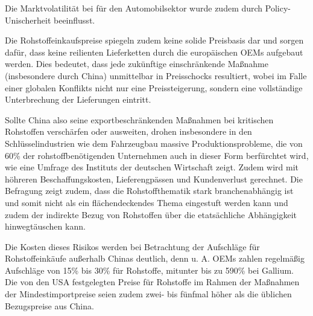 \documentclass[12pt,a4paper,oneside]{book} %
\begin{document}
{Die Marktvolatilität bei für den Automobilsektor wurde zudem durch Policy-Unischerheit\autocite{Mitchell, P. (2021). Why mineral supply may be an e-mobility roadblock. https://www.ey.com/en_gl/insights/energy-resources/why-mineralsupply-may-be-an-e-mobility-roadblock} beeinflusst.

Die Rohstoffeinkaufspreise spiegeln zudem keine solide Preisbasis dar und sorgen dafür, dass keine reilienten Lieferketten durch die europäischen OEMs aufgebaut werden. Dies bedeutet, dass jede zukünftige einschränkende Maßnahme (insbesondere durch China) unmittelbar in Preisschocks resultiert, wobei im Falle einer globalen Konflikts nicht nur eine Preissteigerung, sondern eine vollständige Unterbrechung der Lieferungen eintritt. 

Sollte China also seine exportbeschränkenden Maßnahmen bei kritischen Rohstoffen verschärfen oder ausweiten, drohen insbesondere in den Schlüsselindustrien wie dem Fahrzeugbau massive Produktionsprobleme, die von 60\% der rohstoffbenötigenden Unternehmen auch in dieser Form berfürchtet wird, wie eine Umfrage des Instituts der deutschen Wirtschaft zeigt. Zudem wird mit höhreren Beschaffungskosten, Lieferengpässen und Kundenverlust gerechnet.\autocite{Neligan, Adriana / Bähr, Cornelius / Bardt, Hubertus / Schmitz, Edgar, 2026, Kritische Rohstoffe: Unternehmensbetroffenheit, Versorgungsrisiken und Anpassungsstrategien, in: IW-Trends, 53. Jg., Nr. 2, S. 99-116} Die Befragung zeigt zudem, dass die Rohstoffthematik stark branchenabhängig ist und somit nicht als ein flächendeckendes Thema eingestuft werden kann und zudem der indirekte Bezug von Rohstoffen über die etatsächliche Abhängigkeit hinwegtäuschen kann.\autocite{IW-Trends_2026-2-6_Neligan_et_al_Rohstoffe, S. 106}

Die Kosten dieses Risikos werden bei Betrachtung der Aufschläge für Rohstoffeinkäufe außerhalb Chinas deutlich, denn u. A. OEMs zahlen regelmäßig Aufschläge von 15\% bis 30\% für Rohstoffe, mitunter bis zu 590\% bei Gallium.\autocite{China vs ex-China benchmarks, MetalMiner Sage} Die von den USA festgelegten Preise für Rohstoffe im Rahmen der Maßnahmen der Mindestimportpreise seien zudem zwei- bis fünfmal höher als die üblichen Bezugspreise aus China.

}
\end{document}
